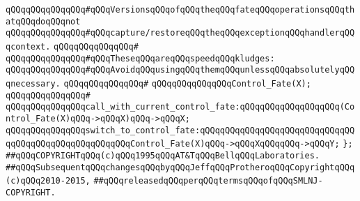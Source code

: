 \newline
\newline
\verb|qQQqqQQqqQQqqQQq#qQQqVersionsqQQqofqQQqtheqQQqfateqQQqoperationsqQQqthatqQQqdoqQQqnot|\newline
\verb|qQQqqQQqqQQqqQQq#qQQqcapture/restoreqQQqtheqQQqexceptionqQQqhandlerqQQqcontext.|\newline
\verb|qQQqqQQqqQQqqQQq#|\newline
\verb|qQQqqQQqqQQqqQQq#qQQqTheseqQQqareqQQqspeedqQQqkludges:|\newline
\verb|qQQqqQQqqQQqqQQq#qQQqAvoidqQQqusingqQQqthemqQQqunlessqQQqabsolutelyqQQqnecessary.|\newline
\verb|qQQqqQQqqQQqqQQq#|\newline
\verb|qQQqqQQqqQQqqQQqControl_Fate(X);|\newline
\verb|qQQqqQQqqQQqqQQq#|\newline
\verb|qQQqqQQqqQQqqQQqcall_with_current_control_fate:qQQqqQQqqQQqqQQqqQQq(Control_Fate(X)qQQq->qQQqX)qQQq->qQQqX;|\newline
\verb|qQQqqQQqqQQqqQQqswitch_to_control_fate:qQQqqQQqqQQqqQQqqQQqqQQqqQQqqQQqqQQqqQQqqQQqqQQqqQQqqQQqControl_Fate(X)qQQq->qQQqXqQQqqQQq->qQQqY;|\newline
\verb|};|\newline
\newline
\newline
\newline
\newline
\verb|##qQQqCOPYRIGHTqQQq(c)qQQq1995qQQqAT&TqQQqBellqQQqLaboratories.|\newline
\verb|##qQQqSubsequentqQQqchangesqQQqbyqQQqJeffqQQqProtheroqQQqCopyrightqQQq(c)qQQq2010-2015,|\newline
\verb|##qQQqreleasedqQQqperqQQqtermsqQQqofqQQqSMLNJ-COPYRIGHT.|\newline

